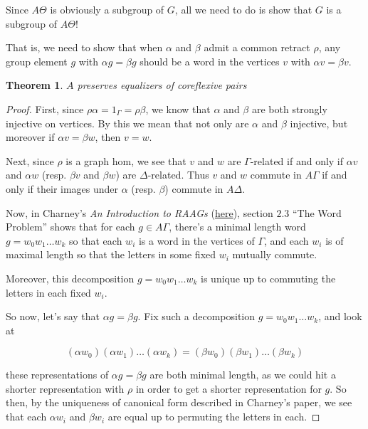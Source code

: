 \documentclass[12pt]{article}
\newtheorem{thm}{Theorem}
\theoremstyle{definition}
\theoremstyle{theorem}
\begin{document}
Since $A\Theta$ is obviously a subgroup of $G$, all we need to do is show that 
$G$ is a subgroup of $A\Theta$! 

That is, we need to show that when 
$\alpha$ and $\beta$ admit a common retract $\rho$,
any group element $g$ with $\alpha g = \beta g$ should be a word in the
vertices $v$ with $\alpha v =  \beta v$.

\begin{thm}
    $A$ preserves equalizers of coreflexive pairs
\end{thm}


\begin{proof}
    First, since $\rho \alpha = 1_\Gamma = \rho \beta$, we know that $\alpha$ and
    $\beta$ are both strongly injective on vertices. By this we mean that not 
    only are $\alpha$ and $\beta$ injective, but moreover if
    $\alpha v = \beta w$, then $v = w$.

    Next, since $\rho$ is a graph
    hom, we see that $v$ and $w$ are $\Gamma$-related if and only if $\alpha v$
    and $\alpha w$ (resp. $\beta v$ and $\beta w$) are $\Delta$-related. Thus 
    $v$ and $w$ commute in $A \Gamma$ if and only if their images under $\alpha$
    (resp. $\beta$) commute in $A \Delta$.

    Now, in Charney's \emph{An Introduction to RAAGs} 
    (\href{https://people.brandeis.edu/~charney/papers/RAAGfinal.pdf}{here}),
    section $2.3$ ``The Word Problem'' shows that for each $g \in A\Gamma$,
    there's a minimal length word $g = w_0 w_1 \ldots w_k$ so that each 
    $w_i$ is a word in the vertices of $\Gamma$, and each $w_i$ is of maximal 
    length so that the letters in some fixed $w_i$ mutually commute.

    Moreover, this decomposition $g = w_0 w_1 \ldots w_k$ is unique up to 
    commuting the letters in each fixed $w_i$.

    So now, let's say that $\alpha g = \beta g$. Fix such a decomposition
    $g = w_0 w_1 \ldots w_k$, and look at 

    \[ (\alpha w_0) (\alpha w_1) \ldots (\alpha w_k) = (\beta w_0) (\beta w_1) \ldots (\beta w_k) \]

    these representations of $\alpha g = \beta g$ are both minimal length, as 
    we could hit a shorter representation with $\rho$ in order to get a 
    shorter representation for $g$. So then, by the uniqueness of canonical form 
    described in Charney's paper, 
    we see that each $\alpha w_i$ and $\beta w_i$ are equal up to permuting the 
    letters in each. 
    

\end{proof}
\end{document}
